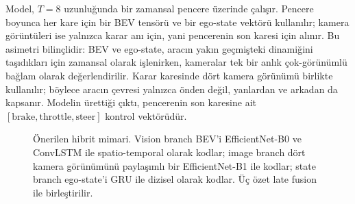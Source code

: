 \documentclass[conference]{IEEEtran}
\begin{document}
Model, $T=8$ uzunluğunda bir zamansal pencere üzerinde çalışır. Pencere boyunca her kare için bir BEV tensörü ve bir ego-state vektörü kullanılır; kamera görüntüleri ise yalnızca karar anı için, yani pencerenin son karesi için alınır. Bu asimetri bilinçlidir: BEV ve ego-state, aracın yakın geçmişteki dinamiğini taşıdıkları için zamansal olarak işlenirken, kameralar tek bir anlık çok-görünümlü bağlam olarak değerlendirilir. Karar karesinde dört kamera görünümü birlikte kullanılır; böylece aracın çevresi yalnızca önden değil, yanlardan ve arkadan da kapsanır. Modelin ürettiği çıktı, pencerenin son karesine ait $[\text{brake}, \text{throttle}, \text{steer}]$ kontrol vektörüdür.

\begin{figure}[t]
\centering
{}
\caption{Önerilen hibrit mimari. Vision branch BEV'i EfficientNet-B0 ve ConvLSTM ile spatio-temporal olarak kodlar; image branch dört kamera görünümünü paylaşımlı bir EfficientNet-B1 ile kodlar; state branch ego-state'i GRU ile dizisel olarak kodlar. Üç özet late fusion ile birleştirilir.}
\label{fig:arch}
\end{figure}
\end{document}
